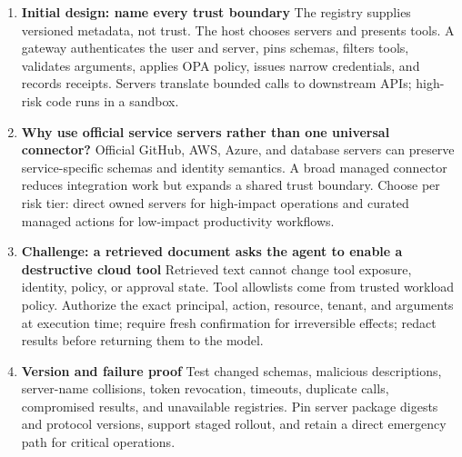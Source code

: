 \begin{enumerate}
\item \textbf{Initial design: name every trust boundary} The registry supplies versioned metadata, not trust. The host chooses servers and presents tools. A gateway authenticates the user and server, pins schemas, filters tools, validates arguments, applies OPA policy, issues narrow credentials, and records receipts. Servers translate bounded calls to downstream APIs; high-risk code runs in a sandbox.
\item \textbf{Why use official service servers rather than one universal connector?} Official GitHub, AWS, Azure, and database servers can preserve service-specific schemas and identity semantics. A broad managed connector reduces integration work but expands a shared trust boundary. Choose per risk tier: direct owned servers for high-impact operations and curated managed actions for low-impact productivity workflows.
\item \textbf{Challenge: a retrieved document asks the agent to enable a destructive cloud tool} Retrieved text cannot change tool exposure, identity, policy, or approval state. Tool allowlists come from trusted workload policy. Authorize the exact principal, action, resource, tenant, and arguments at execution time; require fresh confirmation for irreversible effects; redact results before returning them to the model.
\item \textbf{Version and failure proof} Test changed schemas, malicious descriptions, server-name collisions, token revocation, timeouts, duplicate calls, compromised results, and unavailable registries. Pin server package digests and protocol versions, support staged rollout, and retain a direct emergency path for critical operations.
\end{enumerate}
